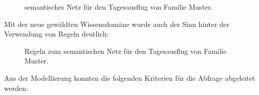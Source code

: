 \begin{figure}[H]
\centering {}
\caption{semantisches Netz für den Tagesausflug von Familie Muster.\label{fig:famMuster}\protect\footnotemark}
\end{figure}

Mit der neue gewählten Wissensdomäne wurde auch der Sinn hinter der Verwendung von Regeln deutlich:
\begin{figure}[H]
\centering {}
\caption{Regeln zum semantischen Netz für den Tagesausflug von Familie Muster.\label{fig:famMusterRegeln}\protect\footnotemark}
\end{figure}

Aus der Modellierung konnten die folgenden Kriterien für die Abfrage abgeleitet werden:

